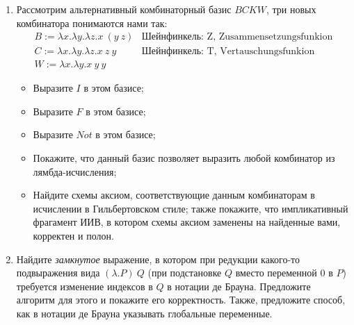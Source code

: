 \documentclass[10pt,a4paper,oneside]{article}
\begin{document}
\begin{enumerate}
\item Рассмотрим альтернативный комбинаторный базис $BCKW$, три новых комбинатора понимаются нами так:
$$\begin{array}{ll}
B := \lambda x.\lambda y.\lambda z.x\ (y\ z) & \text{Шейнфинкель: Z, Zusammensetzungsfunkion}\\
C := \lambda x.\lambda y.\lambda z.x\ z\ y & \text{Шейнфинкель: T, Vertauschungsfunkion}\\
W := \lambda x.\lambda y.x\ y\ y
\end{array}$$

\begin{itemize}
\item Выразите $I$ в этом базисе;
\item Выразите $F$ в этом базисе;
\item Выразите $Not$ в этом базисе;
\item Покажите, что данный базис позволяет выразить любой комбинатор из лямбда-исчисления;
\item Найдите схемы аксиом, соответствующие данным комбинаторам в исчислении в Гильбертовском стиле;
также покажите, что импликативный фрагамент ИИВ, в котором схемы аксиом заменены на найденные вами,
корректен и полон.
\end{itemize}

%
%
%

\item Найдите \emph{замкнутое} выражение, в котором при редукции какого-то подвыражения вида $(\lambda.P)\ Q$ (при 
подстановке $Q$ вместо переменной $0$ в $P$) требуется изменение индексов в $Q$ в нотации де Брауна.
Предложите алгоритм для этого и покажите его корректность.
Также, предложите способ, как в нотации де Брауна указывать глобальные переменные.


\end{enumerate}
\end{document}
